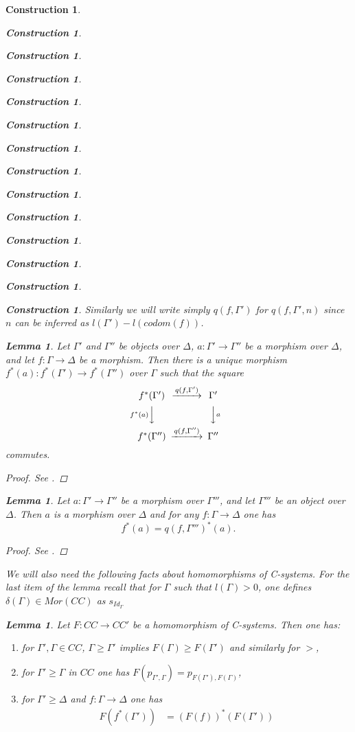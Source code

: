 \documentclass[onecolumn,12pt]{amsart}
\newtheorem{lemma}[proposition]{Lemma}
\numberwithin{proposition}{subsection}
\newtheorem{construction}[proposition]{Construction}
\newcommand{\sr}{\rightarrow}
\begin{document}
\begin{construction}
\begin{construction}
\begin{construction}
\begin{construction}
\begin{construction}
\begin{construction}
\begin{construction}
\begin{construction}
\begin{construction}
\begin{construction}
\begin{construction}
\begin{construction}
\begin{construction}
\begin{construction}
Similarly we will write simply $q(f,\Gamma')$ for $q(f,\Gamma',n)$ since $n$ can be inferred as $l(\Gamma')-l(codom(f))$. 
%
\begin{lemma}
\label{2015.08.23.l1a} 
Let $\Gamma'$ and $\Gamma''$ be objects over $\Delta$,
$a:\Gamma'\sr \Gamma''$ be a morphism over $\Delta$, and let $f:\Gamma\sr\Delta$ be a
morphism. Then there is a unique morphism $f^*(a):f^*(\Gamma')\sr
f^*(\Gamma'')$ over $\Gamma$ such that the square
%
$$
\begin{CD}
f^*(\Gamma') @>q(f,\Gamma')>> \Gamma'\\
@Vf^*(a)VV @VVaV\\
f^*(\Gamma'') @>q(f,\Gamma'')>> \Gamma''
\end{CD}
$$
%
commutes.
\end{lemma}
%
\begin{proof}
See \cite[Lemma 2.13]{fromunivwithPiI}.
\end{proof}
%
\begin{lemma}
\label{2015.08.29.l2} 
Let $a:\Gamma'\sr\Gamma''$ be a morphism over
$\Gamma'''$, and let $\Gamma'''$ be an object over $\Delta$. Then $a$ is a morphism
over $\Delta$ and for any $f:\Gamma\sr \Delta$ one has
%
\begin{equation}\label{2015.08.29.eq2}
f^*(a)=q(f,\Gamma''')^*(a).
\end{equation}%
%
\end{lemma}
%
\begin{proof}
See \cite[Lemma 2.15]{fromunivwithPiI}.
\end{proof}
%
We will also need the following facts about homomorphisms of C-systems. For the
last item of the lemma recall that for $\Gamma$ such that $l(\Gamma)>0$, one
defines $\delta(\Gamma)\in Mor(CC)$ as $s_{Id_{\Gamma}}$
%
\begin{lemma}
\label{2015.09.03.l2}
Let $F:CC\sr CC'$ be a homomorphism of C-systems. Then one has:
%
\begin{enumerate}
\item for $\Gamma',\Gamma\in CC$, $\Gamma\ge \Gamma'$ implies $F(\Gamma)\ge F(\Gamma')$ and similarly for $>$,
\item for $\Gamma'\ge \Gamma$ in $CC$ one has $F(p_{\Gamma',\Gamma})=p_{F(\Gamma'),F(\Gamma)}$,
\item for $\Gamma'\ge \Delta$ and $f:\Gamma\sr \Delta$ one has
  \begin{equation*}
    \begin{split}
      F(f^*(\Gamma'))&=(F(f))^*(F(\Gamma')) \\

\end{split}
\end{equation*}
\end{enumerate}
\end{lemma}
\end{construction}
\end{construction}
\end{construction}
\end{construction}
\end{construction}
\end{construction}
\end{construction}
\end{construction}
\end{construction}
\end{construction}
\end{construction}
\end{construction}
\end{construction}
\end{construction}
\end{document}
